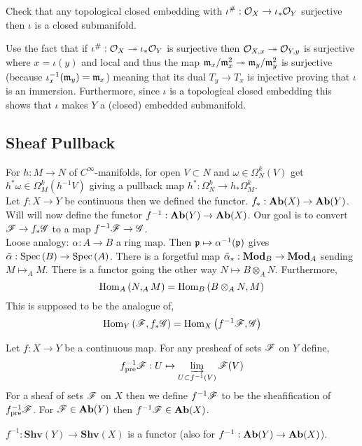 \documentclass[12pt]{article}
\begin{document}
\begin{exercise}
Check that any topological closed embedding with $\iota^\# : \mathcal{O}_{X} \to \iota_* \mathcal{O}_{Y}$ surjective then $\iota$ is a closed submanifold. 
\end{exercise}
\noindent
Use the fact that if $\iota^\# : \mathcal{O}_{X} \twoheadrightarrow \iota_* \mathcal{O}_{Y}$ is surjective then $\mathcal{O}_{X, x} \twoheadrightarrow \mathcal{O}_{Y, y}$ is surjective where $x = \iota(y)$ and local and thus the map $\mathfrak{m}_x / \mathfrak{m}_x^2 \twoheadrightarrow \mathfrak{m}_y / \mathfrak{m}_y^2$ is surjective (because $\iota_x^{-1}(\mathfrak{m}_y) = \mathfrak{m}_x$) meaning that its dual $T_y \to T_x$ is injective proving that $\iota$ is an immersion. Furthermore, since $\iota$ is a topological closed embedding this shows that $\iota$ makes $Y$ a (closed) embedded submanifold.



\subsection{Sheaf Pullback}

For $h : M \to N$ of $C^\infty$-manifolds, for open $V \subset N$ and $\omega \in \Omega^k_N(V)$ get $h^* \omega \in \Omega_M^k(h^{-1} V)$ giving a pullback map $h^* : \Omega^k_N \to h_* \Omega^k_M$. 
\bigskip\\
Let $f : X \to Y$ be continuous then we defined the functor. $f_* : \mathbf{Ab}(X) \to \mathbf{Ab}(Y)$. Will will now define the functor $f^{-1} : \mathbf{Ab}(Y) \to \mathbf{Ab}(X)$. Our goal is to convert $\mathscr{F} \to f_* \mathscr{G}$ to a map $f^{-1} \mathscr{F} \to \mathscr{G}$.
\bigskip\\
Loose analogy: $\alpha : A \to B$ a ring map. Then $\mathfrak{p} \mapsto \alpha^{-1}(\mathfrak{p})$ gives $\tilde{\alpha} : \mathrm{Spec}\left( B \right) \to \mathrm{Spec}\left( A \right)$. There is a forgetful map $\tilde{\alpha}_* : \mathbf{Mod}_{B} \to \mathbf{Mod}_{A}$ sending $M \mapsto _{A} M$. There is a functor going the other way $N \mapsto B \otimes_A N$. Furthermore,
\[ \mathrm{Hom}_{A} \left( N, _{A}{M} \right) = \mathrm{Hom}_{B} \left( B \otimes_A N, M \right) \]
This is supposed to be the analogue of,
\[ \mathrm{Hom}_{Y} \left( \mathscr{F}, f_* \mathscr{G} \right) = \mathrm{Hom}_{X} \left( f^{-1} \mathscr{F}, \mathscr{G} \right) \]

\begin{defn}
Let $f : X \to Y$ be a continuous map. For any presheaf of sets $\mathscr{F}$ on $Y$ define,
\[ f^{-1}_{\text{pre}} \mathscr{F} : U \mapsto \varinjlim_{U \subset f^{-1}(V)} \mathscr{F}(V) \]
For a sheaf of sets $\mathscr{F}$ on $X$ then we define $f^{-1} \mathscr{F}$ to be the sheafification of $f^{-1}_{\text{pre}} \mathscr{F}$. For $\mathscr{F} \in \mathbf{Ab}(Y)$ then $f^{-1} \mathscr{F} \in \mathbf{Ab}(X)$.
\end{defn}

\begin{prop}
$f^{-1} : \mathbf{Shv}(Y) \to \mathbf{Shv}(X)$ is a functor (also for $f^{-1} : \mathbf{Ab}(Y) \to \mathbf{Ab}(X)$).
\end{prop}
\end{document}
